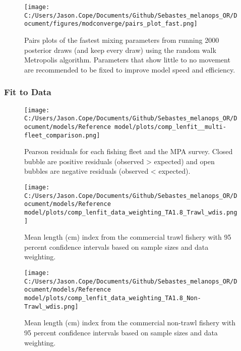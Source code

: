 \documentclass[11pt,
  english,
  letterpaper,
]{article}
\begin{document}
\newpage

\begin{figure}
\centering
\texttt{[image: C:/Users/Jason.Cope/Documents/Github/Sebastes\_melanops\_OR/Document/figures/modconverge/pairs\_plot\_fast.png]}
\caption{Pairs plots of the fastest mixing parameters from running 2000 posterior draws (and keep every draw) using the random walk Metropolis algorithm. Parameters that show little to no movement are recommended to be fixed to improve model speed and efficiency.\label{fig:pairs-plot-fast}}
\end{figure}

\clearpage

\hypertarget{fit-to-data}{%
\subsubsection{Fit to Data}\label{fit-to-data}}

\begin{figure}
\centering
\texttt{[image: C:/Users/Jason.Cope/Documents/Github/Sebastes\_melanops\_OR/Document/models/Reference model/plots/comp\_lenfit\_\_multi-fleet\_comparison.png]}
\caption{Pearson residuals for each fishing fleet and the MPA survey. Closed bubble are positive residuals (observed \textgreater{} expected) and open bubbles are negative residuals (observed \textless{} expected).\label{fig:lt-pearson-resids}}
\end{figure}

\newpage

\begin{figure}
\centering
\texttt{[image: C:/Users/Jason.Cope/Documents/Github/Sebastes\_melanops\_OR/Document/models/Reference model/plots/comp\_lenfit\_data\_weighting\_TA1.8\_Trawl\_wdis.png]}
\caption{Mean length (cm) index from the commercial trawl fishery with 95 percent confidence intervals based on sample sizes and data weighting.\label{fig:trawl-mean-len-fit}}
\end{figure}

\newpage

\begin{figure}
\centering
\texttt{[image: C:/Users/Jason.Cope/Documents/Github/Sebastes\_melanops\_OR/Document/models/Reference model/plots/comp\_lenfit\_data\_weighting\_TA1.8\_Non-Trawl\_wdis.png]}
\caption{Mean length (cm) index from the commercial non-trawl fishery with 95 percent confidence intervals based on sample sizes and data weighting.\label{fig:nontrawl-mean-len-fit}}
\end{figure}
\end{document}
